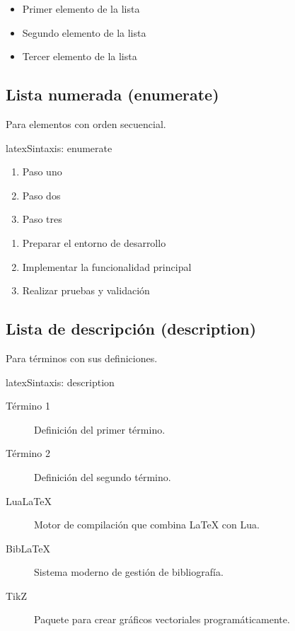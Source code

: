 \begin{itemize}
  \item Primer elemento de la lista
  \item Segundo elemento de la lista
  \item Tercer elemento de la lista
\end{itemize}

\subsection{Lista numerada (enumerate)}

Para elementos con orden secuencial.

\begin{codigosimple}{latex}{Sintaxis: enumerate}
\begin{enumerate}
  \item Paso uno
  \item Paso dos
  \item Paso tres
\end{enumerate}
\end{codigosimple}

\begin{enumerate}
  \item Preparar el entorno de desarrollo
  \item Implementar la funcionalidad principal
  \item Realizar pruebas y validación
\end{enumerate}

\subsection{Lista de descripción (description)}

Para términos con sus definiciones.

\begin{codigosimple}{latex}{Sintaxis: description}
\begin{description}
  \item[Término 1] Definición del primer término.
  \item[Término 2] Definición del segundo término.
\end{description}
\end{codigosimple}

\begin{description}
  \item[LuaLaTeX] Motor de compilación que combina \LaTeX{} con Lua.
  \item[BibLaTeX] Sistema moderno de gestión de bibliografía.
  \item[TikZ] Paquete para crear gráficos vectoriales programáticamente.
\end{description}

